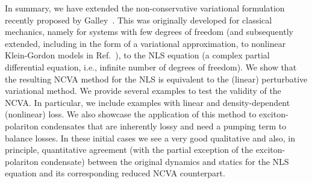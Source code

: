 In summary, we have extended the non-conservative variational formulation 
recently
proposed by Galley~\cite{Galley}. This was 
originally developed for classical mechanics,
namely for systems with few degrees of freedom (and subsequently extended,
including in the form of a variational approximation, to nonlinear
Klein-Gordon models in Ref.~\cite{ref4}), to the NLS
equation (a complex partial differential equation, i.e., infinite number
of degrees of freedom).
%
%
We show that the resulting NCVA method for the
NLS is equivalent to the (linear) perturbative
variational method.
%
We provide several examples to test the validity of the NCVA.
In particular, we include examples with linear and density-dependent (nonlinear)
loss. We also showcase the application of this method to exciton-polariton
condensates that are inherently lossy and need a pumping term to balance losses.
%
In these initial cases we see a very good qualitative and also,
in principle, quantitative agreement (with the partial
exception of the exciton-polariton condensate) between
the original dynamics and statics for the NLS equation
and its corresponding reduced NCVA counterpart.
%

